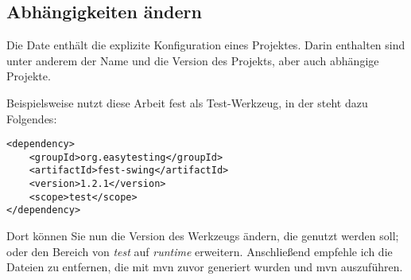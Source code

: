 \subsection{Abhängigkeiten ändern}
Die Date  enthält die explizite Konfiguration eines Projektes. Darin enthalten sind unter anderem der Name und die Version des Projekts, aber auch abhängige Projekte.

Beispielsweise nutzt diese Arbeit \gls{fest} als Test-Werkzeug, in der  steht dazu Folgendes:
\begin{verbatim}
<dependency>
    <groupId>org.easytesting</groupId>
    <artifactId>fest-swing</artifactId>
    <version>1.2.1</version>
    <scope>test</scope>
</dependency>
\end{verbatim}

Dort können Sie nun die Version des Werkzeugs ändern, die genutzt werden soll; oder den Bereich von \emph{test} auf \emph{runtime} erweitern. Anschließend empfehle ich die Dateien zu entfernen, die mit \gls{mvn} zuvor generiert wurden und \gls{mvn} auszuführen.

